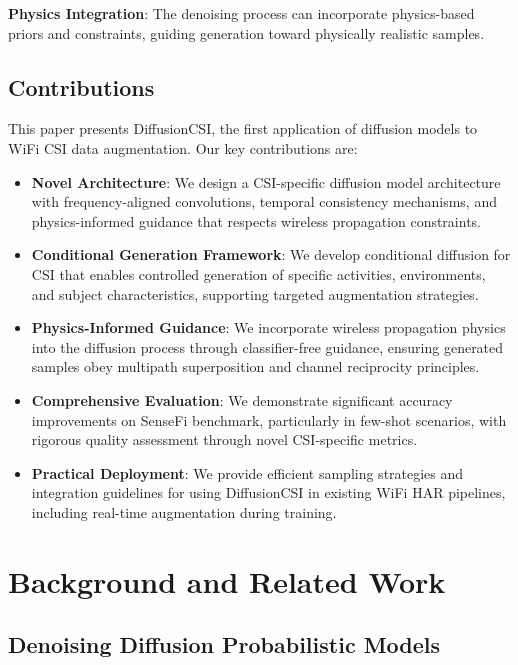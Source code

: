 \documentclass[journal]{IEEEtran}
\begin{document}
\textbf{Physics Integration}: The denoising process can incorporate physics-based priors and constraints, guiding generation toward physically realistic samples.

\subsection{Contributions}

This paper presents DiffusionCSI, the first application of diffusion models to WiFi CSI data augmentation. Our key contributions are:

\begin{itemize}
\item \textbf{Novel Architecture}: We design a CSI-specific diffusion model architecture with frequency-aligned convolutions, temporal consistency mechanisms, and physics-informed guidance that respects wireless propagation constraints.

\item \textbf{Conditional Generation Framework}: We develop conditional diffusion for CSI that enables controlled generation of specific activities, environments, and subject characteristics, supporting targeted augmentation strategies.

\item \textbf{Physics-Informed Guidance}: We incorporate wireless propagation physics into the diffusion process through classifier-free guidance, ensuring generated samples obey multipath superposition and channel reciprocity principles.

\item \textbf{Comprehensive Evaluation}: We demonstrate significant accuracy improvements on SenseFi benchmark, particularly in few-shot scenarios, with rigorous quality assessment through novel CSI-specific metrics.

\item \textbf{Practical Deployment}: We provide efficient sampling strategies and integration guidelines for using DiffusionCSI in existing WiFi HAR pipelines, including real-time augmentation during training.
\end{itemize}

\section{Background and Related Work}

\subsection{Denoising Diffusion Probabilistic Models}
\end{document}

